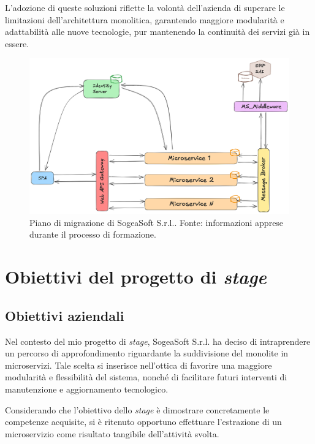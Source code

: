         \vspace{0.2 em}
        \noindent L'adozione di queste soluzioni riflette la volontà dell'azienda di superare le limitazioni dell'architettura monolitica, garantendo maggiore modularità e adattabilità alle nuove tecnologie, pur mantenendo la continuità dei servizi già in essere.

        \begin{figure}[H]
            \centering
            \includegraphics[width=1.0\linewidth]{BCS-Tessi/images/migrazione.png}
            \caption[Piano di migrazione di SogeaSoft S.r.l.]{Piano di migrazione di SogeaSoft S.r.l.. Fonte: informazioni apprese durante il processo di formazione. }
            \label{fig:migrazione}
        \end{figure}
        
    \section{Obiettivi del progetto di \textit{stage}}
        \subsection{Obiettivi aziendali}
        Nel contesto del mio progetto di \textit{stage}, SogeaSoft S.r.l. ha deciso di intraprendere un percorso di approfondimento riguardante la suddivisione del monolite in microservizi. Tale scelta si inserisce nell'ottica di favorire una maggiore modularità e flessibilità del sistema, nonché di facilitare futuri interventi di manutenzione e aggiornamento tecnologico.  

        \vspace{0.2 em}
        \noindent Considerando che l'obiettivo dello \textit{stage} è dimostrare concretamente le competenze acquisite, si è ritenuto opportuno effettuare l'estrazione di un microservizio come risultato tangibile dell'attività svolta. 

